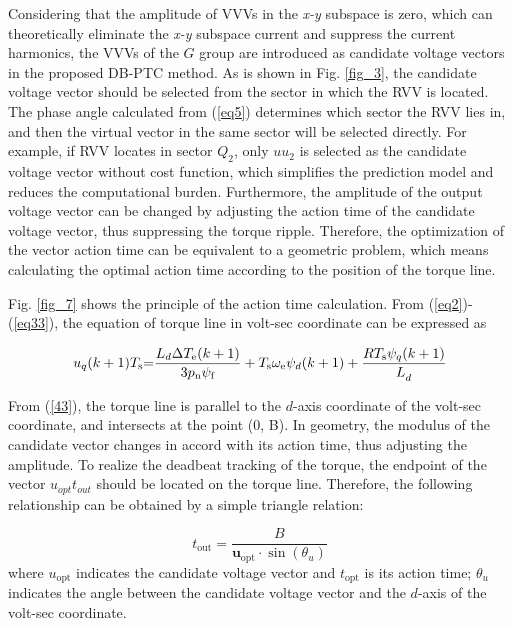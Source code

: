 \documentclass[sn-basic]{sn-jnl}
\theoremstyle{thmstyleone}%
\theoremstyle{thmstyletwo}%
\theoremstyle{thmstylethree}%
\theoremstyle{thmstyleone}%
\begin{document}
 Considering that the amplitude of VVVs in the \textit{x-y} subspace is zero, which can theoretically eliminate the \textit{x-y} subspace current and suppress the current harmonics, the VVVs of the $G$ group are introduced as candidate voltage vectors in the proposed DB-PTC method. As is shown in Fig. \ref{fig_3}, the candidate voltage vector should be selected from the sector in which the RVV is located. The phase angle calculated from (\ref{eq5}) determines which sector the RVV lies in, and then the virtual vector in the same sector will be selected directly. For example, if RVV locates in sector $Q_2$, only ${{uu}_2}$ is selected as the candidate voltage vector without cost function, which simplifies the prediction model and reduces the computational burden. Furthermore, the amplitude of the output voltage vector can be changed by adjusting the action time of the candidate voltage vector, thus suppressing the torque ripple. Therefore, the optimization of the vector action time can be equivalent to a geometric problem, which means calculating the optimal action time according to the position of the torque line. 
 
Fig. \ref{fig_7} shows the principle of the action time calculation. From {(\ref{eq2})}-{(\ref{eq33})}, the equation of torque line in volt-sec coordinate can be expressed as

\begin{equation}\label{43}
\\
   {{u}_{q}}(k+1){{T}_{\text{s}}}\text{=}\frac{{{L}_{d}}\Delta {{T}_{\text{e}}}(k+1)}{3{{p}_{\text{n}}}{{\psi }_{\text{f}}}}+{{T}_{\text{s}}}{{\omega }_{\text{e}}}{{\psi }_{d}}(k+1)+\frac{R{{T}_{\text{s}}}{{\psi }_{q}}(k+1)}{L_{d}^{{}}} \\ 
\end{equation}

From {(\ref{43})}, the torque line is parallel to the ${d}$-axis coordinate of the volt-sec coordinate, and intersects at the point (0, B). In geometry, the modulus of the candidate vector changes in accord with its action time, thus adjusting the amplitude. To realize the deadbeat tracking of the torque, the endpoint of the vector $u_{opt}t_{out}$ should be located on the torque line. Therefore, the following relationship can be obtained by a simple triangle relation:

\begin{equation}
t_{\mathrm{out}}=\frac{B}{\boldsymbol{u}_{\mathrm{opt}} \cdot \sin \left(\theta_{u}\right)}
\end{equation}
where $u_{\mathrm{opt}}$ indicates the candidate voltage vector and $t_{\mathrm{opt}}$ is its action time; $\theta_{u}$ indicates the angle between the candidate voltage vector and the ${d}$-axis of the volt-sec coordinate.
\end{document}
